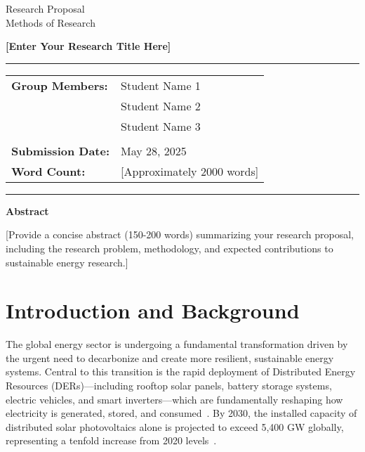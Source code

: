 \documentclass[12pt,a4paper]{article}
\newcommand{\studentone}{Student Name 1}
\newcommand{\studenttwo}{Student Name 2}
\newcommand{\studentthree}{Student Name 3}
\newcommand{\projecttitle}{[Enter Your Research Title Here]}
\newcommand{\submissiondate}{May 28, 2025}
\begin{document}
\begin{titlepage}
\begin{center}
{\Huge{Research Proposal}} \\
\vspace{5mm}
{\Large{Methods of Research}} \\

\vspace{10mm}

{\huge{\textbf{\projecttitle}}} \\

\vspace{15mm}

\hrule
\vspace{3mm}
\begin{tabular}{ll}
\textbf{Group Members:} & {\studentone} \\
& {\studenttwo} \\
& {\studentthree} \\
\\
\textbf{Submission Date:} & {\submissiondate} \\
\textbf{Word Count:} & [Approximately 2000 words] \\
\end{tabular}
\vspace{3mm}
\hrule

\vspace{15mm}

\textbf{Abstract} \\
\vspace{2mm}
\begin{minipage}{0.8\textwidth}
[Provide a concise abstract (150-200 words) summarizing your research proposal, including the research problem, methodology, and expected contributions to sustainable energy research.]
\end{minipage}

\end{center}
\end{titlepage}

\tableofcontents
\newpage

\section{Introduction and Background}
\label{sec:background}


The global energy sector is undergoing a fundamental transformation driven by the urgent need to decarbonize and create more resilient, sustainable energy systems. Central to this transition is the rapid deployment of Distributed Energy Resources (DERs)---including rooftop solar panels, battery storage systems, electric vehicles, and smart inverters---which are fundamentally reshaping how electricity is generated, stored, and consumed~\cite{hirsch2018,irena2019}. By 2030, the installed capacity of distributed solar photovoltaics alone is projected to exceed 5,400 GW globally, representing a tenfold increase from 2020 levels~\cite{iea2021}.
\end{document}
